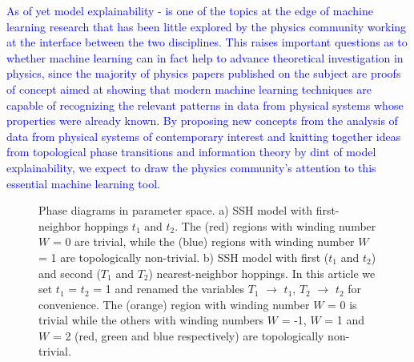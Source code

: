 \documentclass[10pt]{revtex4-1}
\newcommand{\citequote}[1]{\ref{#1}}
\begin{document}
\textcolor{blue}{As of yet model explainability \cite{gilpin2018explaining}-\cite{roscher2020explainable} is one of the topics at the edge of machine learning research that has been little explored by the physics community working at the interface between the two disciplines. This raises important questions as to whether machine learning can in fact help to advance theoretical investigation in physics, since the majority of physics papers published on the subject are proofs of concept aimed at showing that modern machine learning techniques are capable of recognizing the relevant patterns in data from physical systems whose properties were already known. By proposing new concepts from the analysis of data from physical systems of contemporary interest and knitting together ideas from topological phase transitions and information theory by dint of model explainability, we expect to draw the physics community's attention to this essential machine learning tool.  }%
\begin{figure}
\centering
{}\quad
{}
\caption{Phase diagrams in parameter space. a) SSH model with first-neighbor hoppings $t_1$ and $t_2$. The (red) regions with winding number $W$ = 0 are trivial, while the (blue) regions with winding number $W$ = 1 are topologically non-trivial. b) SSH model with first ($t_1$ and $t_2$) and second ($T_1$ and $T_2$) nearest-neighbor hoppings. In this article we set $t_1$ = $t_2$ = 1 and renamed the variables $T_1$ $\rightarrow$ $t_1$, $T_2$ $\rightarrow$ $t_2$ for convenience. The (orange) region with winding number $W$ = 0 is trivial while the others with winding numbers $W$ = -1, $W$ = 1 and $W$ = 2 (red, green and blue respectively) are topologically non-trivial.}
\label{fig:phasediagrams}
\end{figure}
\end{document}
